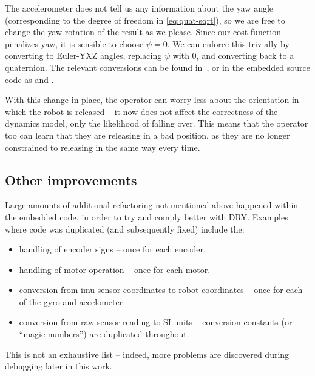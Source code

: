 \documentclass[main.tex]{subfiles}
\begin{document}
	The accelerometer does not tell us any information about the yaw angle (corresponding to the degree of freedom in \cref{eq:quat-sqrt}), so we are free to change the yaw rotation of the result as we please.
	Since our cost function penalizes yaw, it is sensible to choose $\psi = 0$.
	We can enforce this trivially by converting to Euler-YXZ angles, replacing $\psi$ with $0$, and converting back to a quaternion\footnotemark. The relevant conversions can be found in~\cite[eq~362 and 369]{diebel2006representing}, or in the embedded source code as  and .


	With this change in place, the operator can worry less about the orientation in which the robot is released -- it now does not affect the correctness of the dynamics model, only the likelihood of falling over.
	This means that the operator too can learn that they are releasing in a bad position, as they are no longer constrained to releasing in the same way every time.


\subsection{Other improvements}
	Large amounts of additional refactoring not mentioned above happened within the embedded code, in order to try and comply better with DRY.
	Examples where code was duplicated (and subsequently fixed) include the:
	\begin{itemize}[noitemsep]
		\item handling of encoder signs -- once for each encoder.
		\item handling of motor operation -- once for each motor.
		\item conversion from imu sensor coordinates to robot coordinates -- once for each of the gyro and accelometer
		\item conversion from raw sensor reading to SI units -- conversion constants (or \enquote{magic numbers}) are duplicated throughout.
	\end{itemize}
	This is not an exhaustive list -- indeed, more problems are discovered during debugging later in this work.

\bib
\end{document}

